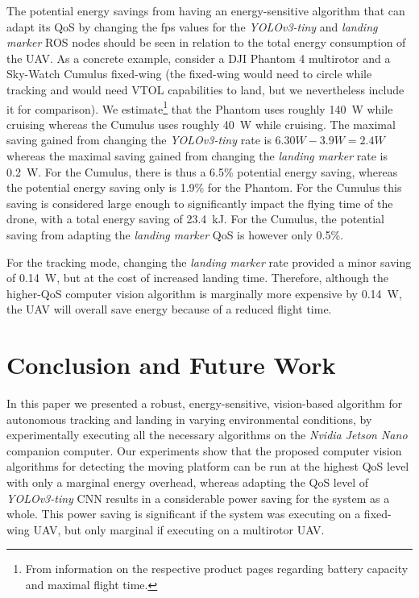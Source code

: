 \documentclass[conference, onecolumn, draftclsnofoot]{IEEEtran}
\begin{document}
The potential energy savings from having an energy-sensitive algorithm
that can adapt its QoS by changing the fps values for the
\emph{YOLOv3-tiny} and \emph{landing marker} ROS nodes should be seen
in relation to the total energy consumption of the UAV. As a concrete
example, consider a DJI Phantom 4 multirotor and a Sky-Watch Cumulus
fixed-wing (the fixed-wing would need to circle while tracking and 
would need VTOL capabilities to land, but we nevertheless include it 
for comparison). We estimate\footnote{From information on the respective
  product pages regarding battery capacity and maximal flight time.}
that the Phantom uses roughly \SI{140}{\watt} while cruising whereas the Cumulus
uses roughly \SI{40}{\watt} while cruising. The maximal saving gained from
changing the \emph{YOLOv3-tiny} rate is $6.30W-3.9W=2.4W$ whereas the
maximal saving gained from changing the \emph{landing marker} rate is
\SI{0.2}{\watt}. For the Cumulus, there is thus a 6.5\% potential energy
saving, whereas the potential energy saving only is 1.9\% for the
Phantom. For the Cumulus this saving is considered large enough to
significantly impact the flying time of the drone, with a total energy
saving of \SI{23.4}{\kilo \joule}. For the Cumulus, the potential saving from adapting
the \emph{landing marker} QoS is however only 0.5\%. 

For the tracking mode, changing the \emph{landing marker} rate
provided a minor saving of \SI{0.14}{\watt}, but at the cost of increased
landing time. Therefore, although the higher-QoS computer vision
algorithm is marginally more expensive by \SI{0.14}{\watt}, the UAV will
overall save energy because of a reduced flight time.

\section{Conclusion and Future Work}
\label{sec:conclusion}

In this paper we presented a robust, energy-sensitive, vision-based
algorithm for autonomous tracking and landing in varying environmental
conditions, by experimentally executing all the necessary algorithms on the \emph{Nvidia Jetson Nano} companion computer.
%
Our experiments show that the proposed computer vision algorithms for detecting the moving platform can be run at the highest QoS level with only a marginal
energy overhead, whereas adapting the QoS level of \emph{YOLOv3-tiny} CNN results in a considerable power saving for the system as a whole. This power saving is significant if the system was executing on a fixed-wing UAV, %
but only marginal if executing on a multirotor UAV.
\end{document}
